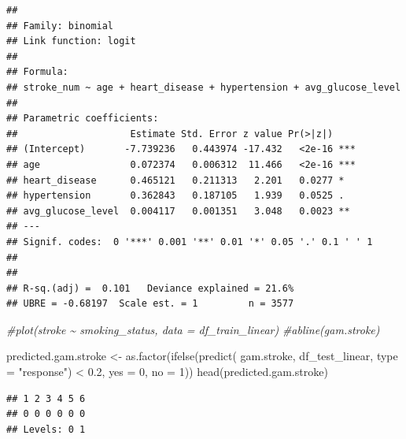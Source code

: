 \documentclass[
]{article}
\newenvironment{Shaded}{\begin{snugshade}}{\end{snugshade}}
\newcommand{\AttributeTok}[1]{\textcolor[rgb]{0.77,0.63,0.00}{#1}}
\newcommand{\CommentTok}[1]{\textcolor[rgb]{0.56,0.35,0.01}{\textit{#1}}}
\newcommand{\DecValTok}[1]{\textcolor[rgb]{0.00,0.00,0.81}{#1}}
\newcommand{\FloatTok}[1]{\textcolor[rgb]{0.00,0.00,0.81}{#1}}
\newcommand{\FunctionTok}[1]{\textcolor[rgb]{0.00,0.00,0.00}{#1}}
\newcommand{\NormalTok}[1]{#1}
\newcommand{\OtherTok}[1]{\textcolor[rgb]{0.56,0.35,0.01}{#1}}
\newcommand{\SpecialCharTok}[1]{\textcolor[rgb]{0.00,0.00,0.00}{#1}}
\newcommand{\StringTok}[1]{\textcolor[rgb]{0.31,0.60,0.02}{#1}}
\renewcommand{\=}[1]{\stackrel{#1}{=}}
\theoremstyle{definition}
\theoremstyle{remark}
\begin{document}
\begin{verbatim}
## 
## Family: binomial 
## Link function: logit 
## 
## Formula:
## stroke_num ~ age + heart_disease + hypertension + avg_glucose_level
## 
## Parametric coefficients:
##                    Estimate Std. Error z value Pr(>|z|)    
## (Intercept)       -7.739236   0.443974 -17.432   <2e-16 ***
## age                0.072374   0.006312  11.466   <2e-16 ***
## heart_disease      0.465121   0.211313   2.201   0.0277 *  
## hypertension       0.362843   0.187105   1.939   0.0525 .  
## avg_glucose_level  0.004117   0.001351   3.048   0.0023 ** 
## ---
## Signif. codes:  0 '***' 0.001 '**' 0.01 '*' 0.05 '.' 0.1 ' ' 1
## 
## 
## R-sq.(adj) =  0.101   Deviance explained = 21.6%
## UBRE = -0.68197  Scale est. = 1         n = 3577
\end{verbatim}

\begin{Shaded}
\begin{Highlighting}[]
\CommentTok{\#plot(stroke \textasciitilde{} smoking\_status, data = df\_train\_linear)}
\CommentTok{\#abline(gam.stroke)}
\end{Highlighting}
\end{Shaded}

\begin{Shaded}
\begin{Highlighting}[]
\NormalTok{predicted.gam.stroke }\OtherTok{\textless{}{-}} \FunctionTok{as.factor}\NormalTok{(}\FunctionTok{ifelse}\NormalTok{(}\FunctionTok{predict}\NormalTok{( gam.stroke, df\_test\_linear, }\AttributeTok{type =} \StringTok{"response"}\NormalTok{) }\SpecialCharTok{\textless{}} \FloatTok{0.2}\NormalTok{, }\AttributeTok{yes =} \DecValTok{0}\NormalTok{, }\AttributeTok{no =} \DecValTok{1}\NormalTok{))}
\FunctionTok{head}\NormalTok{(predicted.gam.stroke)}
\end{Highlighting}
\end{Shaded}

\begin{verbatim}
## 1 2 3 4 5 6 
## 0 0 0 0 0 0 
## Levels: 0 1
\end{verbatim}

\begin{Shaded}
\end{Shaded}
\end{document}
